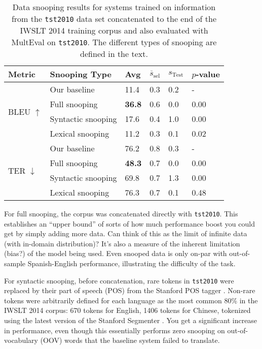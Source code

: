 {\begin{table}[htb]
\begin{center}
\begin{tabular}{|l|l|l|l|l|l|}
\hline
\bf Metric & \bf Snooping Type & \bf Avg & \bf $\overline{s}_{\text{sel}}$ & \bf $s_{\text{Test}}$ & \bf $p$-value \\
\hline
\multirow{4}{*}{BLEU $\uparrow$}
& Our baseline & 11.4 & 0.3 & 0.2 & - \\
& Full snooping & \textbf{36.8} & 0.6 & 0.0 & 0.00 \\
& Syntactic snooping & 17.6 & 0.4 & 1.0 & 0.00 \\
& Lexical snooping & 11.2 & 0.3 & 0.1 & 0.02 \\
\hline
\multirow{4}{*}{TER $\downarrow$}
& Our baseline & 76.2 & 0.8 & 0.3 & - \\
& Full snooping & \textbf{48.3} & 0.7 & 0.0 & 0.00 \\
& Syntactic snooping & 69.8 & 0.7 & 1.3 & 0.00 \\
& Lexical snooping & 76.3 & 0.7 & 0.1 & 0.48 \\
\hline
\end{tabular}
\end{center}

\caption{ \label{tab:snooping} %
Data snooping results for systems trained on information from the {\small \tt tst2010} data set concatenated to the end of the IWSLT 2014 training corpus and also evaluated with MultEval on {\small \tt tst2010}.
The different types of snooping are defined in the text.
} %
\end{table}

For full snooping, the corpus was concatenated directly with {\small \tt tst2010}. 
This establishes an ``upper bound'' of sorts of how much performance boost you could get by simply adding more data.
Can think of this as the limit of infinite data (with in-domain distribution)?
It's also a measure of the inherent limitation (bias?) of the model being used.
Even snooped data is only on-par with out-of-sample Spanish-English performance, illustrating the difficulty of the task.

For syntactic snooping, before concatenation, rare tokens in {\small \tt tst2010} were replaced by their part of speech (POS) from the Stanford POS tagger . 
 Non-rare tokens were arbitrarily defined for each language as the most common 80\% in the IWSLT 2014 corpus: 670 tokens for English, 1406 tokens for Chinese, tokenized using the latest version of the Stanford Segmenter .
You get a significant increase in performance, even though this essentially performs zero snooping on out-of-vocabulary (OOV) words that the baseline system failed to translate.

}
